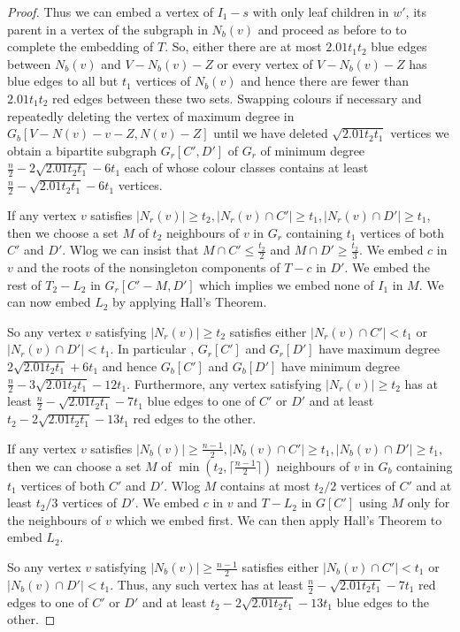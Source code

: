 \documentclass[10pt,a4paper]{amsart}
\begin{document}
\begin{proof}
Thus we can  embed a vertex of $I_1-s$ with only leaf children in $w'$, its parent in a vertex of the subgraph in $N_b(v)$ and proceed as before to 
to complete the embedding of $T$.  So, either there are at most $2.01t_1t_2$ blue edges between $N_b(v)$ and $V-N_b(v)-Z$ or every 
vertex of $V-N_b(v)-Z$ has blue edges to all but $t_1$ vertices of $N_b(v)$ and hence there are fewer than 
$2.01t_1t_2$ red edges between these two sets. Swapping colours if necessary and repeatedly deleting the  vertex  of maximum  degree in 
$G_b[V-N(v)-v-Z,N(v)-Z]$ until we have deleted $\sqrt{2.01t_2t_1}$ vertices we obtain a bipartite subgraph $G_r[C',D']$ of $G_r$  of  minimum degree $\frac{n}{2}-2\sqrt{2.01t_2t_1}-6t_1$ each of whose colour classes contains at least 
$\frac{n}{2}-\sqrt{2.01t_2t_1}-6t_1$ vertices.

If any vertex $v$ satisfies $|N_r(v)| \ge t_2,|N_r(v) \cap C'| \ge t_1,|N_r(v) \cap D'| \ge t_1$,  then we  choose a set $M$ of $t_2$  neighbours of $v$ in $G_r$ containing $t_1$ vertices of both $C'$ and $D'$.
Wlog we can insist that $M \cap C' \le \frac{t_2}{2}$ and $M \cap D' \ge \frac{t_2}{3}$. We embed $c$ in $v$ and  the roots of the nonsingleton components 
of $T-c$ in $D'$. We embed  the rest of $T_2-L_2$ in $G_r[C'-M,D']$ which implies  we embed none of $I_1$ in $M$. We can 
now embed  $L_2$ by applying Hall's Theorem. 

So any vertex $v$ satisfying  $|N_r(v)| \ge t_2$ satisfies either $|N_r(v) \cap C'| <t_1$ or $|N_r(v) \cap D'| < t_1$. 
In particular , $G_r[C']$ and $G_r[D']$ have maximum degree $2\sqrt{2.01t_2t_1}+6t_1$ and hence 
$G_b[C']$ and $G_b[D']$ have minimum degree $\frac{n}{2}-3\sqrt{2.01t_2t_1}-12t_1$. Furthermore, 
any vertex satisfying  $|N_r(v)| \ge t_2$ has at least $\frac{n}{2}-\sqrt{2.01t_2t_1}-7t_1$ blue edges to one of 
$C'$ or $D'$ and at least $t_2-2\sqrt{2.01t_2t_1}-13t_1$ red edges to the other. 


If any vertex $v$ satisfies $|N_b(v)| \ge \frac{n-1}{2},|N_b(v) \cap C'| \ge t_1,|N_b(v) \cap D'| \ge t_1$, then we can choose 
a set $M$ of $\min(t_2,\lceil \frac{n-1}{2}\rceil)$ neighbours of $v$ in $ G_b$ containing $t_1$ vertices of both $C'$ and $D'$.  Wlog $M$  contains at most $t_2/2$ vertices of  $C'$ and at least $t_2/3$ vertices of $D'$. We embed $c$ in $v$ and $T-L_2$ in $G[C']$ using $M$ only for the neighbours of $v$ which 
we embed first. We can then apply Hall's Theorem to embed $L_2$.

So any vertex $v$ satisfying  $|N_b(v)| \ge \frac{n-1}{2}$ satisfies either $|N_b(v) \cap C'| <t_1$ or $|N_b(v) \cap D'| < t_1$. 
Thus, any such   vertex has at least $\frac{n}{2}-\sqrt{2.01t_2t_1}-7t_1$ red  edges to one of 
$C'$ or $D'$ and at least $t_2 -2\sqrt{2.01t_2t_1}-13t_1$ blue  edges to the other. 


\end{proof}
\end{document}
